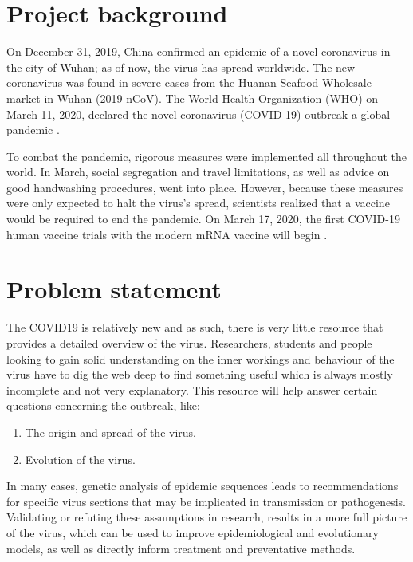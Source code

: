 \section{Project background}
On December 31, 2019, China confirmed an epidemic of a novel coronavirus in the city of Wuhan; as of now, the virus has spread worldwide. The new coronavirus was found in severe cases from the Huanan Seafood Wholesale market in Wuhan (2019-nCoV). The World Health Organization (WHO) on March 11, 2020, declared the novel coronavirus (COVID-19) outbreak a global pandemic \citep{cucinotta2020declares}.

To combat the pandemic, rigorous measures were implemented all throughout the world. In March, social segregation and travel limitations, as well as advice on good handwashing procedures, went into place. However, because these measures were only expected to halt the virus's spread, scientists realized that a vaccine would be required to end the pandemic. On March 17, 2020, the first COVID-19 human vaccine trials with the modern mRNA vaccine will begin \citep{national2020nih}. 

\section{Problem statement}
The COVID19 is relatively new and as such, there is very little resource that provides a detailed overview of the virus. Researchers, students and people looking to gain solid understanding on the inner workings and behaviour of the virus have to dig the web deep to find something useful which is always mostly incomplete and not very explanatory. This resource will help answer certain questions concerning the outbreak, like:
\begin{enumerate}
	\item The origin and spread of the virus.
	\item Evolution of the virus.
	
\end{enumerate}
In many cases, genetic analysis of epidemic sequences leads to recommendations for specific virus sections that may be implicated in transmission or pathogenesis. Validating or refuting these assumptions in research, results in a more full picture of the virus, which can be used to improve epidemiological and evolutionary models, as well as directly inform treatment and preventative methods.


